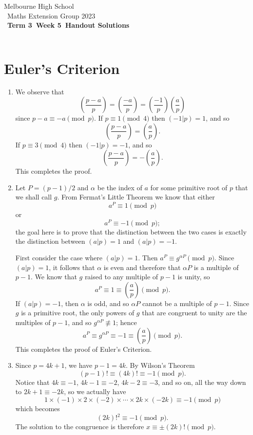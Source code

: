 \documentclass[a4paper]{article}
\title{{\thepdftitle}}
\author{Nathan Wong\and Tom Yan}
\date{2023}
\newcommand{\theterm}{3}
\newcommand{\theweek}{5}
\newcommand{\thedisplaytitle}{Term \theterm\ Week \theweek\ Handout Solutions}
\newcommand{\leg}[2]{\left(\frac{#1}{#2}\right)}
\newcommand{\ileg}[2]{(#1|#2)}
\begin{document}
\noindent Melbourne High School\\\
\noindent Maths Extension Group 2023\\\
\noindent \textbf{\thedisplaytitle}\\\
\section*{Euler's Criterion}
\begin{enumerate}
\item We observe that 
\[\leg{p-a}{p}=\leg{-a}{p}=\leg{-1}{p}\leg{a}{p}\]
since \(p-a\equiv-a\pmod{p}\).
If \(p\equiv1\pmod{4}\) then \(\ileg{-1}{p}=1\), and so
\[\leg{p-a}{p}=\leg{a}{p}.\]
If \(p\equiv3\pmod{4}\) then \(\ileg{-1}{p}=-1\), and so
\[\leg{p-a}{p}=-\leg{a}{p}.\]
This completes the proof.
\item Let \(P=(p-1)/2\) and 
\(\alpha\) be the index of \(a\) for some primitive root
of \(p\) that we shall call \(g\).
From Fermat's Little Theorem we know that either
\[a^P\equiv1\pmod{p}\]
or \[a^P\equiv-1\pmod{p};\] the goal here is to prove
that the distinction between the two cases is exactly
the distinction between \(\ileg{a}{p}=1\) and \(\ileg{a}{p}=-1\).

 First consider the case where \(\ileg{a}{p}=1\).
Then \(a^P\equiv g^{\alpha P}\pmod{p}\).
Since \(\ileg{a}{p}=1\), it follows that \(\alpha\)
is even and therefore that \(\alpha P\) is a multiple
of \(p-1\). We know that \(g\) raised to any multiple
of \(p-1\) is unity, so 
\[a^P\equiv1\equiv\leg{a}{p}\pmod{p}.\]
If \(\ileg{a}{p}=-1\), then \(\alpha\) is odd, and so
\(\alpha P\) cannot be a multiple of \(p-1\). Since \(g\)
is a primitive root, the only powers of \(g\) that are congruent
to unity are the multiples of \(p-1\), and so
\(g^{\alpha P}\not\equiv1\); hence 
\[a^P\equiv g^{\alpha P}\equiv-1\equiv\leg{a}{p}\pmod{p}.\]
This completes the proof of Euler's Criterion.
\item Since \(p=4k+1\), we have \(p-1=4k\). By Wilson's Theorem
\[(p-1)!\equiv (4k)!\equiv-1\pmod{p}.\]
Notice that \(4k\equiv-1\), \(4k-1\equiv-2\), \(4k-2\equiv-3\), and so
on, all the way down to \(2k+1\equiv-2k\), so we actually have
\[ 1\times(-1)\times2\times(-2)\times\cdots\times 2k\times(-2k)\equiv-1\pmod{p}\]
which becomes
\[(2k)!^2\equiv-1\pmod{p}.\]
The solution to the congruence is therefore \(x\equiv\pm(2k)!\pmod{p}.\)
\end{enumerate}
\end{document}
